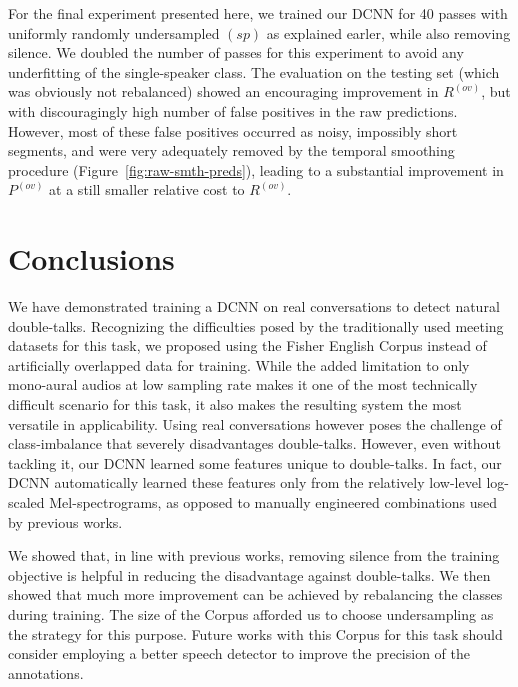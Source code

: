 \documentclass[a4paper]{article}
\begin{document}
For the final experiment presented here,
we trained our DCNN for 40 passes with uniformly randomly undersampled $(sp)$ as explained earler, while also removing silence.
We doubled the number of passes for this experiment to avoid any underfitting of the single-speaker class.
The evaluation on the testing set (which was obviously not rebalanced) showed an encouraging improvement in $R^{(ov)}$,
but with discouragingly high number of false positives in the raw predictions.
However, most of these false positives occurred as noisy, impossibly short segments,
and were very adequately removed by the temporal smoothing procedure (Figure~\ref{fig:raw-smth-preds}),
leading to a substantial improvement in $P^{(ov)}$ at a still smaller relative cost to $R^{(ov)}$.

\section{Conclusions}
We have demonstrated training a DCNN on real conversations to detect natural double-talks.
Recognizing the difficulties posed by the traditionally used meeting datasets for this task,
we proposed using the Fisher English Corpus instead of artificially overlapped data for training.
While the added limitation to only mono-aural audios at low sampling rate makes it one of the most technically difficult scenario for this task,
it also makes the resulting system the most versatile in applicability.
Using real conversations however poses the challenge of class-imbalance that severely disadvantages double-talks.
However, even without tackling it, our DCNN learned some features unique to double-talks.
In fact, our DCNN automatically learned these features only from the relatively low-level log-scaled Mel-spectrograms,
as opposed to manually engineered combinations used by previous works.

We showed that, in line with previous works,
removing silence from the training objective is helpful in reducing the disadvantage against double-talks.
We then showed that much more improvement can be achieved by rebalancing the classes during training.
The size of the Corpus afforded us to choose undersampling as the strategy for this purpose.
Future works with this Corpus for this task should consider employing a better speech detector to improve the precision of the annotations.
\end{document}
